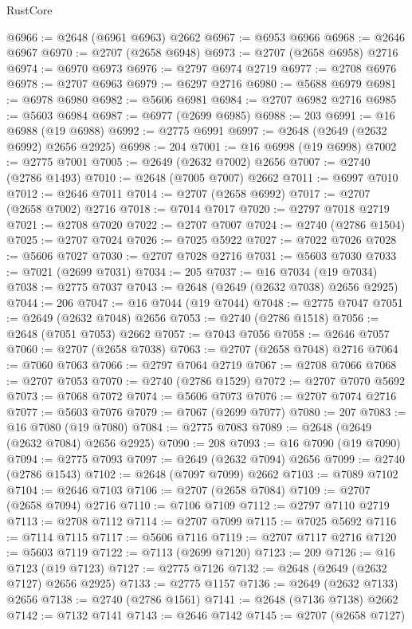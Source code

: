 \begin{lexlean}{RustCore}
\begin{coremodule}
@6966 := @2648 (@6961 @6963) @2662
@6967 := @6953 @6966
@6968 := @2646 @6967
@6970 := @2707 (@2658 @6948)
@6973 := @2707 (@2658 @6958) @2716
@6974 := @6970 @6973
@6976 := @2797 @6974 @2719
@6977 := @2708 @6976
@6978 := @2707 @6963
@6979 := @6297 @2716
@6980 := @5688 @6979
@6981 := @6978 @6980
@6982 := @5606 @6981
@6984 := @2707 @6982 @2716
@6985 := @5603 @6984
@6987 := @6977 (@2699 @6985)
@6988 := 203
@6991 := @16 @6988 (@19 @6988)
@6992 := @2775 @6991
@6997 := @2648 (@2649 (@2632 @6992) @2656 @2925)
@6998 := 204
@7001 := @16 @6998 (@19 @6998)
@7002 := @2775 @7001
@7005 := @2649 (@2632 @7002) @2656
@7007 := @2740 (@2786 @1493)
@7010 := @2648 (@7005 @7007) @2662
@7011 := @6997 @7010
@7012 := @2646 @7011
@7014 := @2707 (@2658 @6992)
@7017 := @2707 (@2658 @7002) @2716
@7018 := @7014 @7017
@7020 := @2797 @7018 @2719
@7021 := @2708 @7020
@7022 := @2707 @7007
@7024 := @2740 (@2786 @1504)
@7025 := @2707 @7024
@7026 := @7025 @5922
@7027 := @7022 @7026
@7028 := @5606 @7027
@7030 := @2707 @7028 @2716
@7031 := @5603 @7030
@7033 := @7021 (@2699 @7031)
@7034 := 205
@7037 := @16 @7034 (@19 @7034)
@7038 := @2775 @7037
@7043 := @2648 (@2649 (@2632 @7038) @2656 @2925)
@7044 := 206
@7047 := @16 @7044 (@19 @7044)
@7048 := @2775 @7047
@7051 := @2649 (@2632 @7048) @2656
@7053 := @2740 (@2786 @1518)
@7056 := @2648 (@7051 @7053) @2662
@7057 := @7043 @7056
@7058 := @2646 @7057
@7060 := @2707 (@2658 @7038)
@7063 := @2707 (@2658 @7048) @2716
@7064 := @7060 @7063
@7066 := @2797 @7064 @2719
@7067 := @2708 @7066
@7068 := @2707 @7053
@7070 := @2740 (@2786 @1529)
@7072 := @2707 @7070 @5692
@7073 := @7068 @7072
@7074 := @5606 @7073
@7076 := @2707 @7074 @2716
@7077 := @5603 @7076
@7079 := @7067 (@2699 @7077)
@7080 := 207
@7083 := @16 @7080 (@19 @7080)
@7084 := @2775 @7083
@7089 := @2648 (@2649 (@2632 @7084) @2656 @2925)
@7090 := 208
@7093 := @16 @7090 (@19 @7090)
@7094 := @2775 @7093
@7097 := @2649 (@2632 @7094) @2656
@7099 := @2740 (@2786 @1543)
@7102 := @2648 (@7097 @7099) @2662
@7103 := @7089 @7102
@7104 := @2646 @7103
@7106 := @2707 (@2658 @7084)
@7109 := @2707 (@2658 @7094) @2716
@7110 := @7106 @7109
@7112 := @2797 @7110 @2719
@7113 := @2708 @7112
@7114 := @2707 @7099
@7115 := @7025 @5692
@7116 := @7114 @7115
@7117 := @5606 @7116
@7119 := @2707 @7117 @2716
@7120 := @5603 @7119
@7122 := @7113 (@2699 @7120)
@7123 := 209
@7126 := @16 @7123 (@19 @7123)
@7127 := @2775 @7126
@7132 := @2648 (@2649 (@2632 @7127) @2656 @2925)
@7133 := @2775 @1157
@7136 := @2649 (@2632 @7133) @2656
@7138 := @2740 (@2786 @1561)
@7141 := @2648 (@7136 @7138) @2662
@7142 := @7132 @7141
@7143 := @2646 @7142
@7145 := @2707 (@2658 @7127)

\end{coremodule}
\end{lexlean}

